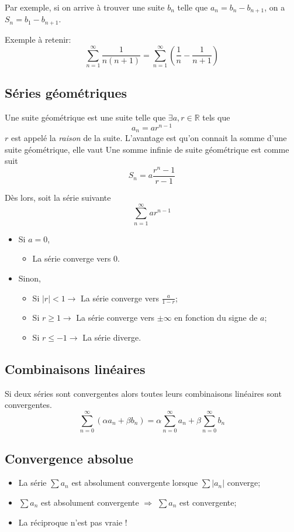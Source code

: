 Par exemple, si on arrive à trouver une suite $b_n$ telle que
$a_n = b_n - b_{n+1}$, on a
$S_n = b_1 - b_{n+1}$.

Exemple à retenir:
\[ \sum_{n = 1}^{\infty} \frac{1}{n(n + 1)} =
\sum_{n =1}^{\infty} \left(\frac{1}{n} - \frac{1}{n + 1}\right) \]

\subsection{Séries géométriques}
Une suite géométrique est une suite telle que $\exists a, r \in \mathbb{R}$
tels que
\[ a_n = ar^{n-1} \]
$r$ est appelé la \emph{raison} de la suite.
L'avantage est qu'on connait la somme d'une suite géométrique, elle vaut
Une somme infinie de suite géométrique est comme suit
\[ S_n = a \frac{r^n - 1}{r - 1} \]

Dès lors, soit la série suivante
\[ \sum_{n = 1}^{\infty} ar^{n-1} \]
\begin{itemize}
  \item Si $a = 0$,
    \begin{itemize}
      \item La série converge vers 0.
    \end{itemize}
  \item Sinon,
    \begin{itemize}
      \item Si $|r| < 1 \rightarrow$ La série converge vers $\frac{a}{1 - r}$;
      \item Si $r \geq 1 \rightarrow$ La série converge vers $\pm \infty$
        en fonction du signe de $a$;
      \item Si $r \leq -1 \rightarrow$ La série diverge.
    \end{itemize}
\end{itemize}

\subsection{Combinaisons linéaires}
Si deux séries sont convergentes alors
toutes leurs combinaisons linéaires sont convergentes.
\[ \sum_{n=0}^{\infty} (\alpha a_n + \beta b_n)
= \alpha\sum_{n=0}^{\infty}a_n + \beta\sum_{n=0}^{\infty}b_n \]

\subsection{Convergence absolue}
\begin{itemize}
  \item
    La série $\sum a_n$ est absolument convergente
    lorsque $\sum |a_n|$ converge;
  \item
    $\sum a_n$ est absolument convergente
    $\Rightarrow$ $\sum a_n$ est convergente;
  \item
    La réciproque n'est pas vraie !
\end{itemize}

